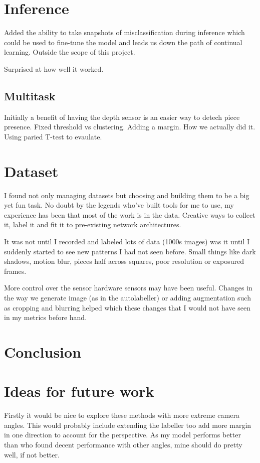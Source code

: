\section{Inference}
Added the ability to take snapshots of misclassification during inference which could be used to fine-tune the model and leads us down the 
path of continual learning.  Outside the scope of this project.

Surprised at how well it worked.

\subsection{Multitask}
Initially a benefit of having the depth sensor is an easier way to detech piece presence.  
Fixed threshold vs clustering.  Adding a margin.  How we actually did it.
Using paried T-test to evaulate.

\section{Dataset}
I found not only managing datasets but choosing and building them to be a big yet fun task.  No doubt by the legends who've built tools for me to use,
my experience has been that most of the work is in the data. Creative ways to collect it, label it and fit it to pre-existing network architectures.  

It was not until I recorded and labeled lots of data (1000s images) was it until I suddenly started to see new patterns I had not seen before.  Small 
things like dark shadows, motion blur, pieces half across squares, poor resolution or exposured frames.

More control over the sensor hardware sensors may have been useful.  Changes in the way we generate image (as in the autolabeller) or
adding augmentation such as cropping and blurring helped which these changes that I would not have seen in my metrics before hand.

\section{Conclusion}



\section{Ideas for future work}
Firstly it would be nice to explore these methods with more extreme camera angles.  This would probably include extending the labeller too add more 
margin in one direction to account for the perspective. As my model performs better than \cite{} who found decent performance with other angles, mine should 
do pretty well, if not better.

